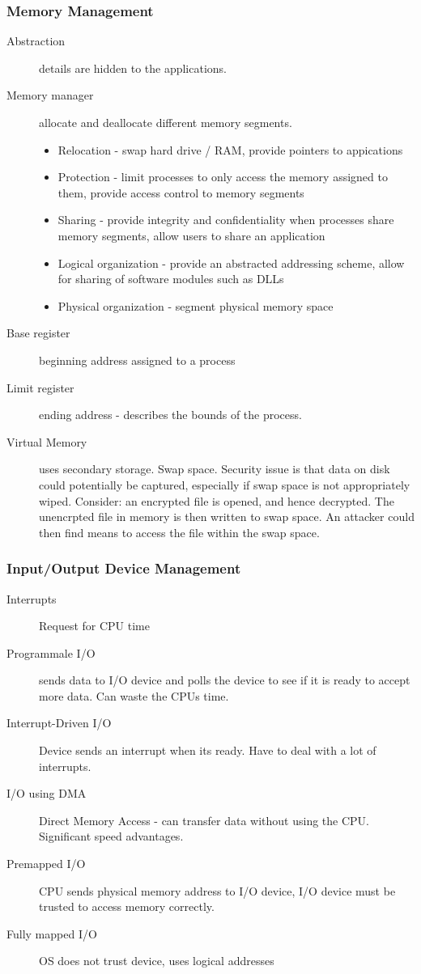 \documentclass[11pt]{article}
\begin{document}
\subsubsection{Memory Management}
\label{sec:org61b9c39}
\begin{description}
\item[{Abstraction}] details are hidden to the applications.
\item[{Memory manager}] allocate and deallocate different memory segments.
\begin{itemize}
\item Relocation - swap hard drive / RAM, provide pointers to appications
\item Protection - limit processes to only access the memory assigned to them, provide access control to memory segments
\item Sharing - provide integrity and confidentiality when processes share memory segments, allow users to share an application
\item Logical organization - provide an abstracted addressing scheme, allow for sharing of software modules such as DLLs
\item Physical organization - segment physical memory space
\end{itemize}
\item[{Base register}] beginning address assigned to a process
\item[{Limit register}] ending address - describes the bounds of the process.
\item[{Virtual Memory}] uses secondary storage. Swap space. Security issue is that data on disk could potentially be captured, especially if swap space is not appropriately wiped. Consider: an encrypted file is opened, and hence decrypted. The unencrpted file in memory is then written to swap space. An attacker could then find means to access the file within the swap space.
\end{description}
\subsubsection{Input/Output Device Management}
\label{sec:orgb158283}
\begin{description}
\item[{Interrupts}] Request for CPU time
\item[{Programmale I/O}] sends data to I/O device and polls the device to see if it is ready to accept more data. Can waste the CPUs time.
\item[{Interrupt-Driven I/O}] Device sends an interrupt when its ready. Have to deal with a lot of interrupts.
\item[{I/O using DMA}] Direct Memory Access - can transfer data without using the CPU. Significant speed advantages.
\item[{Premapped I/O}] CPU sends physical memory address to I/O device, I/O device must be trusted to access memory correctly.
\item[{Fully mapped I/O}] OS does not trust device, uses logical addresses
\end{description}
\end{document}
